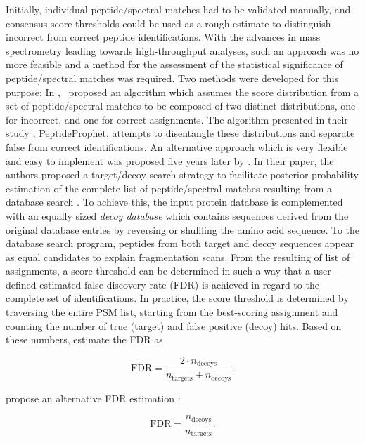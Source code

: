 Initially, individual peptide/spectral matches had to be validated manually,
and consensus score thresholds could be used as a rough estimate to distinguish
incorrect from correct peptide identifications.
With the advances in mass spectrometry leading towards high-throughput analyses,
such an approach was no more feasible and a method for the assessment of
the statistical significance of peptide/spectral matches was required.
Two methods were developed for this purpose: 
In \citeyear{Keller2002}, \citeauthor{Keller2002}~proposed an algorithm which
assumes the score distribution from a set of 
peptide/spectral matches to be composed of two distinct distributions,
one for incorrect, and one for correct assignments. 
The algorithm presented in their study \citep{Keller2002}, PeptideProphet,
attempts to disentangle these distributions and separate false from correct
identifications.
An alternative approach which is very flexible and easy to implement was
proposed five years later by \citeauthor{Elias2007}.
In their paper, the authors proposed a target/decoy search strategy to 
facilitate posterior probability estimation of the complete list of
peptide/spectral matches resulting from a database search \citep{Elias2007}.
To achieve this, the input protein database is complemented with an equally 
sized {\em decoy database} which contains sequences derived from the original
database entries by reversing or shuffling the amino acid sequence.
To the database search program, peptides from both target and decoy sequences 
appear as equal candidates to explain fragmentation scans.
From the resulting of list of assignments, a score threshold can be determined
in such a way that a user-defined estimated false discovery rate (FDR) is
achieved in regard to the complete set of identifications.
In practice, the score threshold is determined by traversing the entire PSM 
list, starting from the best-scoring assignment and counting the number
of true (target) and false positive (decoy) hits.
Based on these numbers, \citeauthor{Elias2007} estimate the FDR as

\begin{equation}
\text{FDR} = \frac{2 \cdot n_{\text{decoys}}}{n_{\text{targets}} + n_{\text{decoys}}}.
\end{equation}

\citeauthor{Kall2008a} propose an alternative FDR estimation 
\citep{Kall2008a}:

\begin{equation}
\text{FDR} = \frac{n_{\text{decoys}}}{n_{\text{targets}}}.
\end{equation}

